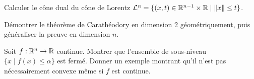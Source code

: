 \begin{exercice}[$\star\star$]
Calculer le c\^one dual du c\^one de Lorentz
$\mathcal{L}^n = \{(x,t) \in \mathbb{R}^{n-1}\times\mathbb{R} \mid \left\| x \right\| \leq t\}$.
\end{exercice}

\begin{exercice}[$\star\star\star$]
D\'emontrer le th\'eor\`eme de Carath\'eodory en dimension 2 g\'eom\'etriquement,
puis g\'en\'eraliser la preuve en dimension $n$.
\end{exercice}

\begin{exercice}[$\star\star\star$]
Soit $f : \mathbb{R}^n \to \mathbb{R}$ continue. Montrer que l'ensemble de sous-niveau
$\{x \mid f(x) \leq \alpha\}$ est ferm\'e. Donner un exemple montrant qu'il
n'est pas n\'ecessairement convexe m\^eme si $f$ est continue.
\end{exercice}
